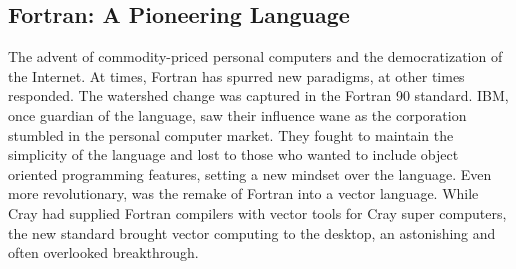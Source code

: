 \subsection{Fortran: A Pioneering Language}
The advent of commodity-priced personal computers and the democratization of the Internet. At times, Fortran has spurred new paradigms, at other times responded. The watershed change was captured in the Fortran 90 standard. IBM, once  guardian of the language, saw their influence wane as the corporation stumbled in the personal computer market. They fought to maintain the simplicity of the language and lost to those who wanted to include object oriented programming features, setting a new mindset over the language. Even more revolutionary, was the remake of Fortran into a vector language. While Cray had supplied Fortran compilers with vector tools for Cray super computers, the new standard brought vector computing to the desktop, an astonishing and often overlooked breakthrough.
